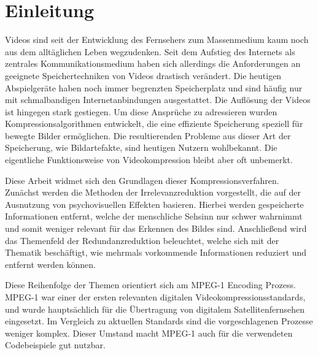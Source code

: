 \chapter{Einleitung} 

Videos sind seit der Entwicklung des Fernsehers zum Massenmedium kaum noch aus dem alltäglichen Leben wegzudenken. Seit dem Aufstieg des Internets als zentrales Kommunikationsmedium haben sich allerdings die Anforderungen an geeignete Speichertechniken von Videos drastisch verändert. Die heutigen Abspielgeräte haben noch immer begrenzten Speicherplatz und sind häufig nur mit schmalbandigen Internetanbindungen ausgestattet. Die Auflösung der Videos ist hingegen stark gestiegen. Um diese Ansprüche zu adressieren wurden Kompressionsalgorithmen entwickelt, die eine effiziente Speicherung speziell für bewegte Bilder ermöglichen. Die resultierenden Probleme aus dieser Art der Speicherung, wie Bildartefakte, sind heutigen Nutzern wohlbekannt. Die eigentliche Funktionsweise von Videokompression bleibt aber oft unbemerkt.

Diese Arbeit widmet sich den Grundlagen dieser Kompressionsverfahren. Zunächst werden die Methoden der Irrelevanzreduktion vorgestellt, die auf der Ausnutzung von psychovisuellen Effekten basieren. Hierbei werden gespeicherte Informationen entfernt, welche der menschliche Sehsinn nur schwer wahrnimmt und somit weniger relevant für das Erkennen des Bildes sind. Anschließend wird das Themenfeld der Redundanzreduktion beleuchtet, welche sich mit der Thematik beschäftigt, wie mehrmals vorkommende Informationen reduziert und entfernt werden können.

Diese Reihenfolge der Themen orientiert sich am MPEG-1 Encoding Prozess. MPEG-1 war einer der ersten relevanten digitalen Videokompressionsstandards, und wurde hauptsächlich für die Übertragung von digitalem Satellitenfernsehen eingesetzt. Im Vergleich zu aktuellen Standards sind die vorgeschlagenen Prozesse weniger komplex. Dieser Umstand macht MPEG-1 auch für die verwendeten Codebeispiele gut nutzbar.
